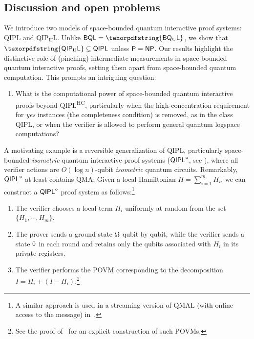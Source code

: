 \documentclass[10pt,a4paper]{article}
\numberwithin{equation}{section}
\numberwithin{figure}{section}
\newcommand{\Ptime}{\textnormal{\textsf{P}}\xspace}
\newcommand{\NP}{\textnormal{\textsf{NP}}\xspace}
\newcommand{\QMA}{\textnormal{\textsf{QMA}}\xspace}
\newcommand{\QIPL}{\textnormal{\textsf{QIPL}}\xspace}
\newcommand{\QMAL}{\textnormal{\textsf{QMAL}}\xspace}
\newcommand{\QIPUL}{\texorpdfstring{\textnormal{\textsf{QIP}\textsubscript{\textnormal{U}}\textsf{L}}}\xspace}
\newcommand{\QIPLHC}{\texorpdfstring{\textnormal{\textsf{QIPL}\textsuperscript{\textnormal{HC}}}}\xspace}
\newcommand{\BQL}{\textnormal{\textsf{BQL}}\xspace}
\newcommand{\BQUL}{\texorpdfstring{\textnormal{\textsf{BQ}\textsubscript{U}\textsf{L}}}\xspace}
\let\ket\relax\DeclarePairedDelimiter\ket{\lvert}{\rangle}
\begin{document}
\subsection{Discussion and open problems}

We introduce two models of space-bounded quantum interactive proof systems: \QIPL{} and \QIPUL{}. Unlike $\BQL = \BQUL$, we show that $\QIPUL \subsetneq \QIPL$ unless $\Ptime = \NP$. Our results highlight the distinctive role of (pinching) intermediate measurements in space-bounded quantum interactive proofs, setting them apart from space-bounded quantum computation. This prompts an intriguing question: 

\begin{enumerate}[label={\upshape(\alph*)},itemsep=0.3em,topsep=0.3em,parsep=0.3em]
    \item What is the computational power of space-bounded quantum interactive proofs beyond \QIPLHC{}, particularly when the high-concentration requirement for \textit{yes} instances (the completeness condition) is removed, as in the class \QIPL{}, or when the verifier is allowed to perform general quantum logspace computations?  \label{probitem:generalQIPL}
\end{enumerate}

A motivating example is a reversible generalization of \QIPL{}, particularly space-bounded \textit{isometric} quantum interactive proof systems ($\QIPL^{\diamond}$, see ), where all verifier actions are $O(\log{n})$-qubit \textit{isometric} quantum circuits. Remarkably, $\QIPL^{\diamond}$ at least contains \QMA{}:
Given a local Hamiltonian $H = \sum_{i=1}^m H_i$, we can construct a $\QIPL^{\diamond}$ proof system as follows:\footnote{A similar approach is used in a streaming version of \QMAL{} (with online access to the message) in~\cite{GR23online}.} 
\begin{enumerate}[label={\upshape(\roman*)},itemsep=0.3em,topsep=0.3em,parsep=0.3em]
    \item The verifier chooses a local term $H_i$ uniformly at random from the set $\{H_1,\cdots,H_m\}$. 
    \item The prover sends a ground state $\ket{\Omega}$ qubit by qubit, while the verifier sends a state $\ket{0}$ in each round and retains only the qubits associated with $H_i$ in its private registers. 
    \item The verifier performs the POVM corresponding to the decomposition $I = H_i + (I - H_i)$.\footnote{See the proof of~\cite[Proposition 14.2]{KSV02} for an explicit construction of such POVMs.} 
\end{enumerate}
\end{document}
